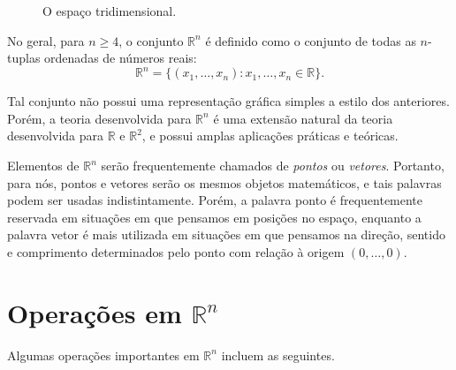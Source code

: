 \begin{figure}[ht]
    \centering
    \caption{O espaço tridimensional.}
\end{figure}

No geral, para $n\geq 4$, o conjunto $\mathbb R^n$ é definido como o conjunto de todas as $n$-tuplas ordenadas de números reais:
\begin{equation*}
    \mathbb R^n = \{(x_1, \ldots, x_n) : x_1, \ldots, x_n \in \mathbb R\}.
\end{equation*}

Tal conjunto não possui uma representação gráfica simples a estilo dos anteriores.
Porém, a teoria desenvolvida para $\mathbb R^n$ é uma extensão natural da teoria desenvolvida para $\mathbb R$ e $\mathbb R^2$, e possui amplas aplicações práticas e teóricas.

Elementos de $\mathbb R^n$ serão frequentemente chamados de \emph{pontos} ou \emph{vetores}.
Portanto, para nós, pontos e vetores serão os mesmos objetos matemáticos, e tais palavras podem ser usadas indistintamente.
Porém, a palavra ponto é frequentemente reservada em situações em que pensamos em posições no espaço, enquanto a palavra vetor é mais utilizada em situações em que pensamos na direção, sentido e comprimento determinados pelo ponto com relação à origem $(0, \ldots, 0)$.
\section{Operações em $\mathbb R^n$}

Algumas operações importantes em $\mathbb R^n$ incluem as seguintes.

